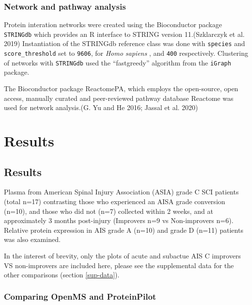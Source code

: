 \documentclass[9pt,lineno]{elife}
\begin{document}
\clearpage

\hypertarget{pathway-analysis-chap3}{%
\subsubsection{Network and pathway analysis}\label{pathway-analysis-chap3}}

Protein interation networks were created using the Bioconductor package \texttt{STRINGdb} which provides an R interface to STRING version 11.(Szklarczyk et al. 2019)
Instantiation of the STRINGdb reference class was done with \texttt{species} and \texttt{score\_threshold} set to \texttt{9606}, for \emph{Homo sapiens} , and \texttt{400} respectively.
Clustering of networks with \texttt{STRINGdb} used the ``fastgreedy'' algorithm from the \texttt{iGraph} package.

The Bioconductor package ReactomePA, which employs the open-source, open access, manually curated and peer-reviewed pathway database Reactome was used for network analysis.(G. Yu and He 2016; Jassal et al. 2020)

\hypertarget{results}{%
\section{Results}\label{results}}

\hypertarget{chap-3-results}{%
\subsection{Results}\label{chap-3-results}}

Plasma from American Spinal Injury Association (ASIA) grade C SCI patients (total n=17) contrasting those who experienced an AISA grade conversion (n=10), and those who did not (n=7) collected within 2 weeks, and at approximately 3 months post-injury (Improvers n=9 vs Non-improvers n=6). Relative protein expression in AIS grade A (n=10) and grade D (n=11) patients was also examined.

In the interest of brevity, only the plots of acute and subactue AIS C improvers VS non-improvers are included here, please see the supplemental data for the other comparisons (section \ref{sup-data}).

\hypertarget{comparing-openms-and-proteinpilot}{%
\subsubsection{Comparing OpenMS and ProteinPilot}\label{comparing-openms-and-proteinpilot}}
\end{document}
